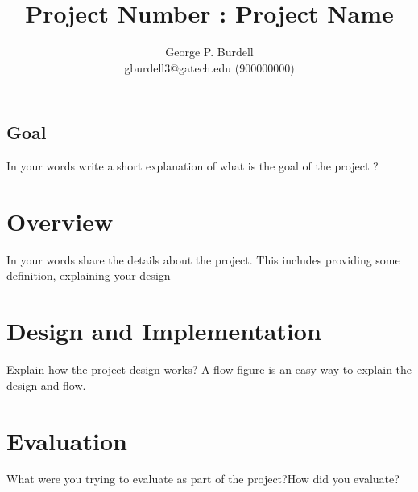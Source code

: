 \documentclass[letterpaper,twocolumn,10pt]{article}
\begin{document}
\date{}

\title{\Large \bf Project Number : Project Name}

\author{
{\rm George P. Burdell}\\ gburdell3@gatech.edu (900000000)}

\maketitle

\thispagestyle{empty}

\subsection*{Goal}
In your words write a short explanation of what is the goal of the project \cite{Einstein}?


\section{Overview}
In your words share the details about the project. This includes providing some definition, explaining your design 

\section{Design and Implementation}
Explain how the project design works? A flow figure is an easy way to explain the design and flow.

\section{Evaluation}
What were you trying to evaluate as part of the project?How did you evaluate?
\end{document}
